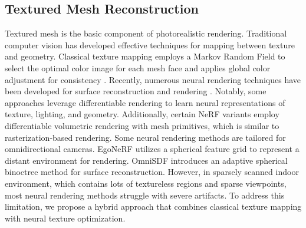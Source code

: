 \subsection{Textured Mesh Reconstruction}
Textured mesh is the basic component of photorealistic rendering. Traditional computer vision has developed effective techniques for mapping between texture and geometry. Classical texture mapping \cite{lempitsky2007seamless,waechter2014TexRecon,fu2018texture} employs a Markov Random Field to select the optimal color image for each mesh face and applies global color adjustment for consistency \cite{waechter2014TexRecon}. Recently, numerous neural rendering techniques have been developed for surface reconstruction \cite{wang2021neus,yu2022monosdf,choi2023tmo,xiao2024debsdf} and rendering \cite{mildenhall2021nerf,barron2022mip,barron2023zip,kerbl20233d}. Notably, some approaches leverage differentiable rendering \cite{nvdiffrast,PyTorch3D,Mitsuba3,munkberg2021nvdiffrec,Goel_2022_CVPR} to learn neural representations of texture, lighting, and geometry. Additionally, certain NeRF variants \cite{SNeRG,chen2023mobilenerf,NeuRas,DNMP,Choi2024LTM} employ differentiable volumetric rendering with mesh primitives, which is similar to rasterization-based rendering. Some neural rendering methods are tailored for omnidirectional cameras. EgoNeRF \cite{choi2023balanced} utilizes a spherical feature grid to represent a distant environment for rendering. OmniSDF \cite{kim2024omnisdf} introduces an adaptive spherical binoctree method for surface reconstruction. However, in sparsely scanned indoor environment, which contains lots of textureless regions and sparse viewpoints, most neural rendering methods struggle with severe artifacts. To address this limitation, we propose a hybrid approach that combines classical texture mapping with neural texture optimization.



